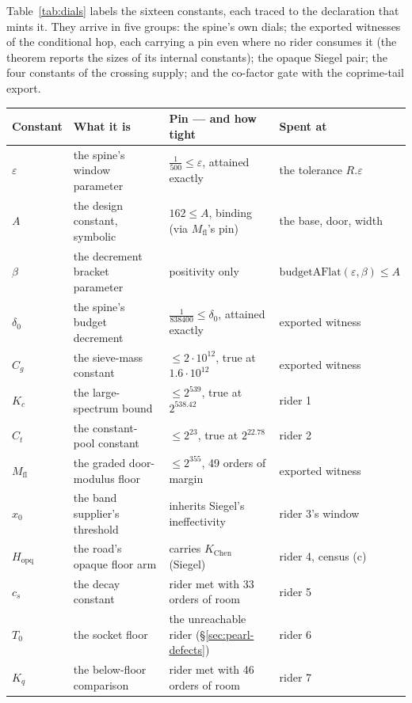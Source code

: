 \documentclass[11pt]{amsart}
\theoremstyle{remark}
\begin{document}
Table~\ref{tab:dials} labels the sixteen constants, each traced to the
declaration that mints it. They arrive in five groups: the spine's own
dials; the exported witnesses of the conditional hop, each carrying a
pin even where no rider consumes it (the theorem reports the sizes of
its internal constants); the opaque Siegel pair; the four constants of
the crossing supply; and the co-factor gate with the coprime-tail
export.

\begin{table}[h]
\centering\scriptsize\setlength{\tabcolsep}{4pt}
\begin{tabular}{llll}
\toprule
Constant & What it is & Pin --- and how tight & Spent at \\
\midrule
$\varepsilon$ & the spine's window parameter & $\tfrac{1}{500}\le\varepsilon$, attained exactly & the tolerance $R.\varepsilon$ \\
$A$ & the design constant, symbolic & $162\le A$, binding (via $M_{\mathrm{fl}}$'s pin) & the base, door, width \\
$\beta$ & the decrement bracket parameter & positivity only & $\mathrm{budgetAFlat}(\varepsilon,\beta)\le A$ \\
$\delta_0$ & the spine's budget decrement & $\tfrac{1}{838400}\le\delta_0$, attained exactly & exported witness \\
\midrule
$C_g$ & the sieve-mass constant & $\le 2\cdot10^{12}$, true at $1.6\cdot10^{12}$ & exported witness \\
$K_c$ & the large-spectrum bound & $\le 2^{539}$, true at $2^{538.42}$ & rider 1 \\
$C_t$ & the constant-pool constant & $\le 2^{23}$, true at $2^{22.78}$ & rider 2 \\
$M_{\mathrm{fl}}$ & the graded door-modulus floor & $\le 2^{355}$, 49 orders of margin & exported witness \\
\midrule
$x_0$ & the band supplier's threshold & inherits Siegel's ineffectivity & rider 3's window \\
$H_{\mathrm{opq}}$ & the road's opaque floor arm & carries $K_{\mathrm{Chen}}$ (Siegel) & rider 4, census (c) \\
\midrule
$c_s$ & the decay constant & rider met with 33 orders of room & rider 5 \\
$T_0$ & the socket floor & the unreachable rider (\S\ref{sec:pearl-defects}) & rider 6 \\
$K_q$ & the below-floor comparison & rider met with 46 orders of room & rider 7 \\

\end{tabular}
\end{table}
\end{document}
